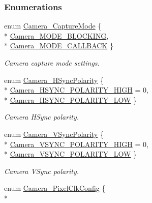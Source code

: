 \subsubsection*{Enumerations}
\begin{DoxyCompactItemize}
\item 
enum \hyperlink{_camera_8h_a74c8a8a13eebddea16c33c726d096ba8}{Camera\+\_\+\+Capture\+Mode} \{ \\*
\hyperlink{_camera_8h_a74c8a8a13eebddea16c33c726d096ba8aad6127b321c6b22ffe1a50caee5a4fe1}{Camera\+\_\+\+M\+O\+D\+E\+\_\+\+B\+L\+O\+C\+K\+I\+N\+G}, 
\\*
\hyperlink{_camera_8h_a74c8a8a13eebddea16c33c726d096ba8ae2f15a1a358226aa81d59509f5a31191}{Camera\+\_\+\+M\+O\+D\+E\+\_\+\+C\+A\+L\+L\+B\+A\+C\+K}
 \}
\begin{DoxyCompactList}\small\item\em Camera capture mode settings. \end{DoxyCompactList}\item 
enum \hyperlink{_camera_8h_a44b110de33cc32adba6d4a5807665987}{Camera\+\_\+\+H\+Sync\+Polarity} \{ \\*
\hyperlink{_camera_8h_a44b110de33cc32adba6d4a5807665987af152b2a7d9da944fe46858efe055d095}{Camera\+\_\+\+H\+S\+Y\+N\+C\+\_\+\+P\+O\+L\+A\+R\+I\+T\+Y\+\_\+\+H\+I\+G\+H} = 0, 
\\*
\hyperlink{_camera_8h_a44b110de33cc32adba6d4a5807665987abcb1c81f87d7738515cd6b22afc09cc5}{Camera\+\_\+\+H\+S\+Y\+N\+C\+\_\+\+P\+O\+L\+A\+R\+I\+T\+Y\+\_\+\+L\+O\+W}
 \}
\begin{DoxyCompactList}\small\item\em Camera H\+Sync polarity. \end{DoxyCompactList}\item 
enum \hyperlink{_camera_8h_a05347818dd7d8986a24a0fe1bc74d412}{Camera\+\_\+\+V\+Sync\+Polarity} \{ \\*
\hyperlink{_camera_8h_a05347818dd7d8986a24a0fe1bc74d412acde960b001c2a12b75b7fad97bf7ec54}{Camera\+\_\+\+V\+S\+Y\+N\+C\+\_\+\+P\+O\+L\+A\+R\+I\+T\+Y\+\_\+\+H\+I\+G\+H} = 0, 
\\*
\hyperlink{_camera_8h_a05347818dd7d8986a24a0fe1bc74d412a3f3b042b294fe98c91a6d50c7989db35}{Camera\+\_\+\+V\+S\+Y\+N\+C\+\_\+\+P\+O\+L\+A\+R\+I\+T\+Y\+\_\+\+L\+O\+W}
 \}
\begin{DoxyCompactList}\small\item\em Camera V\+Sync polarity. \end{DoxyCompactList}\item 
enum \hyperlink{_camera_8h_a081a0e4af0b04d76a5476d22e6cf8657}{Camera\+\_\+\+Pixel\+Clk\+Config} \{ \\*

\end{DoxyCompactItemize}
